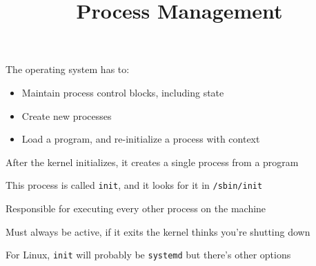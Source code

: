 

\title{Process Management}


    \begin{frame}
        \titlepage
    \end{frame}
   

  \begin{slide}

    The operating system has to:
    \begin{itemize}
      \item Maintain process control blocks, including state
      \item Create new processes
      \item Load a program, and re-initialize a process with context
    \end{itemize}

  \end{slide}
  
        \begin{slide}
    

        After the kernel initializes, it creates a single process
        from a program
        \bigskip


        This process is called \texttt{init}, and it looks for it in \texttt{/sbin/init}

        \leftspace{}Responsible for executing every other process on the machine

        \leftspace{}Must always be active, if it exits the kernel thinks you're shutting down
        \bigskip

        For Linux, \texttt{init} will probably be \texttt{systemd} but there's other options
        \bigskip

        
    \end{slide}
    
